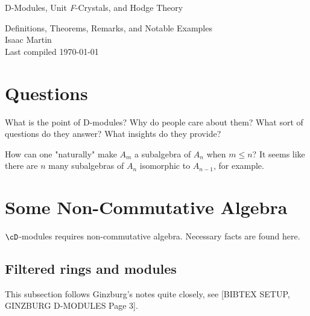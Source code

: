 


\begin{center}
	\Large
	\begin{LARGE}
		D-Modules, Unit \textit{F}-Crystals, and Hodge Theory \\
	\end{LARGE}
	Definitions, Theorems, Remarks, and Notable Examples \\
	Isaac Martin \\
    Last compiled \today
\end{center}
\normalsize
\vspace{-2mm}
\hru

\tableofcontents
\newpage
\section{Questions}
\begin{question}\label{q:D-mod-why-care}
	What is the point of D-modules? Why do people care about them? What sort of questions do they answer? What insights do they provide?
\end{question}

\begin{question}\label{q:why-Weyl-subalgebra-natural}
	How can one "naturally" make $A_m$ a subalgebra of $A_n$ when $m \leq n$? It seems like there are $n$ many subalgebras of $A_n$ isomorphic to $A_{n-1}$, for example.
\end{question}
\section{Some Non-Commutative Algebra}
$\cD$-modules requires non-commutative algebra. Necessary facts are found here.
\subsection{Filtered rings and modules}
This subsection follows Ginzburg's notes quite closely, see [BIBTEX SETUP, GINZBURG D-MODULES Page 3]. 


